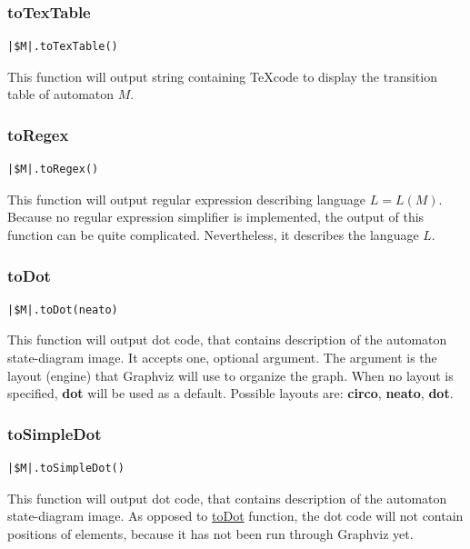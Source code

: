 \documentclass{ctuthesis}
\begin{document}
\subsubsection{toTexTable}
\begin{lstlisting}[language = JASL_snippet]
	|$M|.toTexTable()
\end{lstlisting}

This function will output string containing \TeX code to display the transition table of automaton $M$. 

\subsubsection{toRegex}
\begin{lstlisting}[language = JASL_snippet]
	|$M|.toRegex()
\end{lstlisting}

This function will output regular expression describing language $L = L(M)$. Because no regular expression simplifier is implemented, the output of this function can be quite complicated. Nevertheless, it describes the language $L$.

\subsubsection{toDot}
\label{subsec:toDot}
\begin{lstlisting}[language = JASL_snippet]
	|$M|.toDot(neato)
\end{lstlisting}

This function will output dot code, that contains description of the automaton state-diagram image. It accepts one, optional argument. The argument is the layout (engine) that Graphviz will use to organize the graph. When no layout is specified, \textbf{dot} will be used as a default. Possible layouts are: \textbf{circo}, \textbf{neato}, \textbf{dot}. 

\subsubsection{toSimpleDot}
\begin{lstlisting}[language = JASL_snippet]
	|$M|.toSimpleDot()
\end{lstlisting}

This function will output dot code, that contains description of the automaton state-diagram image. As opposed to \hyperref[subsec:toDot]{toDot} function, the dot code will not contain positions of elements, because it has not been run through Graphviz yet. 
\end{document}
